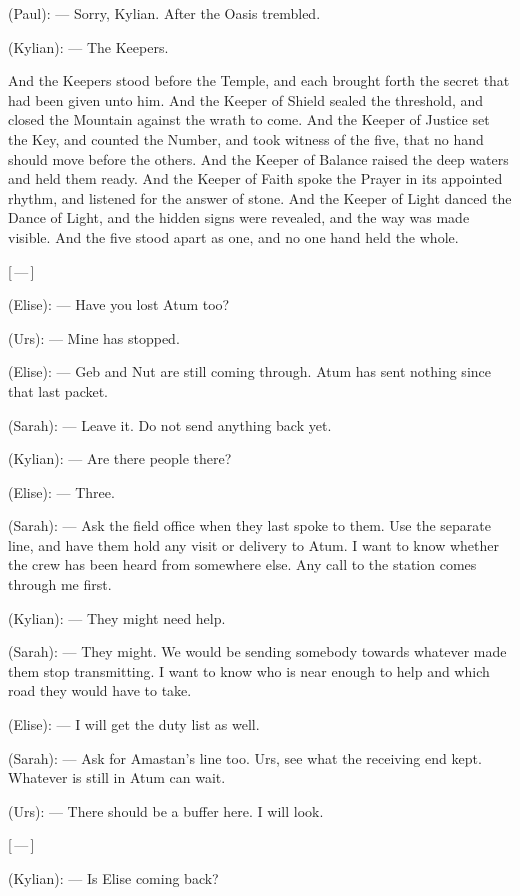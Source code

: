 \begin{room}
(Paul): --- Sorry, Kylian. After the Oasis trembled.

(Kylian): --- The Keepers.

\begin{scripture}
And the Keepers stood before the Temple, and each brought forth the secret that had been given unto him. And the Keeper of Shield sealed the threshold, and closed the Mountain against the wrath to come. And the Keeper of Justice set the Key, and counted the Number, and took witness of the five, that no hand should move before the others. And the Keeper of Balance raised the deep waters and held them ready. And the Keeper of Faith spoke the Prayer in its appointed rhythm, and listened for the answer of stone. And the Keeper of Light danced the Dance of Light, and the hidden signs were revealed, and the way was made visible. And the five stood apart as one, and no one hand held the whole.
\end{scripture}

\centerline{[\,---\,]}

(Elise): --- Have you lost Atum too?

(Urs): --- Mine has stopped.

(Elise): --- Geb and Nut are still coming through. Atum has sent nothing since that last packet.

(Sarah): --- Leave it. Do not send anything back yet.

(Kylian): --- Are there people there?

(Elise): --- Three.

(Sarah): --- Ask the field office when they last spoke to them. Use the separate line, and have them hold any visit or delivery to Atum. I want to know whether the crew has been heard from somewhere else. Any call to the station comes through me first.

(Kylian): --- They might need help.

(Sarah): --- They might. We would be sending somebody towards whatever made them stop transmitting. I want to know who is near enough to help and which road they would have to take.

(Elise): --- I will get the duty list as well.

(Sarah): --- Ask for Amastan's line too. Urs, see what the receiving end kept. Whatever is still in Atum can wait.

(Urs): --- There should be a buffer here. I will look.

\centerline{[\,---\,]}

(Kylian): --- Is Elise coming back?


\end{room}

